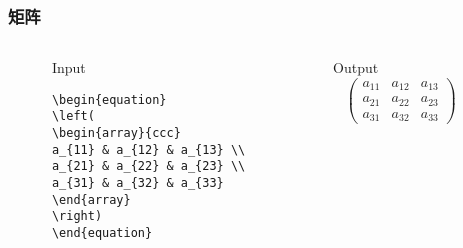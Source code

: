 \begin{frame}[fragile]\frametitle{矩阵}
  \begin{columns}
    \begin{column}{0.05\textwidth}
    \end{column}
    \begin{column}{0.45\textwidth}
    \begin{block}{Input}
    \begin{verbatim}
\begin{equation}
\left(
\begin{array}{ccc}
a_{11} & a_{12} & a_{13} \\
a_{21} & a_{22} & a_{23} \\
a_{31} & a_{32} & a_{33}
\end{array}
\right)
\end{equation}
    \end{verbatim}
    \end{block}
    \end{column}
    \begin{column}{0.025\textwidth}
    \end{column}
    \begin{column}{0.45\textwidth}
    \begin{block}{Output}
        \begin{equation}
        \left(
        \begin{array}{ccc}
        a_{11} & a_{12} & a_{13} \\
        a_{21} & a_{22} & a_{23} \\
        a_{31} & a_{32} & a_{33}
        \end{array}
        \right)
        \end{equation}
    \end{block}
    \end{column}
    \begin{column}{0.025\textwidth}
    \end{column}
  \end{columns}
\end{frame}

